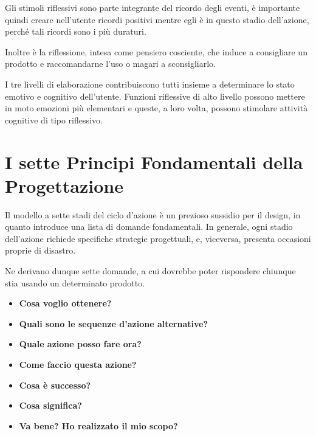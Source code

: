 Gli stimoli riflessivi sono parte integrante del ricordo degli eventi, è importante quindi creare nell'utente ricordi positivi mentre egli è in questo stadio dell'azione, perché tali ricordi sono i più duraturi.

Inoltre è la riflessione, intesa come pensiero cosciente, che induce a consigliare un prodotto e raccomandarne l'uso o magari a sconsigliarlo.

I tre livelli di elaborazione contribuiscono tutti insieme a determinare lo stato emotivo e cognitivo dell'utente. Funzioni riflessive di alto livello possono mettere in moto emozioni più elementari e  queste, a loro volta, possono stimolare attività cognitive di tipo riflessivo.

\section{I sette Principi Fondamentali della Progettazione}
Il modello a sette stadi del ciclo d'azione è un prezioso sussidio per il design, in quanto introduce una lista di domande fondamentali. In generale, ogni stadio dell'azione richiede specifiche strategie progettuali, e, viceversa, presenta occasioni proprie di disastro.

Ne derivano dunque sette domande, a cui dovrebbe poter rispondere chiunque stia usando un determinato prodotto.

\begin{itemize}
	\item \textbf{Cosa voglio ottenere?}
	\item \textbf{Quali sono le sequenze d'azione alternative?}
	\item \textbf{Quale azione posso fare ora?}
	\item \textbf{Come faccio questa azione?}
	\item \textbf{Cosa è successo?}
	\item \textbf{Cosa significa?}
	\item \textbf{Va bene? Ho realizzato il mio scopo?}
\end{itemize}

